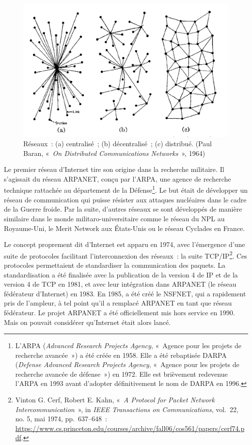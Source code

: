 \documentclass[
  a5paper,
  smalldemyvopaper,10pt,twoside,onecolumn,openright,extrafontsizes,hidelinks]{memoir}
\begin{document}
\begin{figure}

{\centering \includegraphics{chapters/img/baran1964-networks.png}

}

\caption{Réseaux~: (a) centralisé~; (b) décentralisé~; (c) distribué.
(Paul Baran, «~\emph{On Distributed Communications Networks}~», 1964)}

\end{figure}%

Le premier réseau d'Internet tire son origine dans la recherche
militaire. Il s'agissait du réseau ARPANET, conçu par l'ARPA, une agence
de recherche technique rattachée au département de la
Défense\footnote{L'ARPA (\emph{Advanced Research Projects Agency},
  «~Agence pour les projets de recherche avancée~») a été créée en 1958.
  Elle a été rebaptisée DARPA (\emph{Defense Advanced Research Projects
  Agency}, «~Agence pour les projets de recherche avancée de défense~»)
  en 1972. Elle est brièvement redevenue l'ARPA en 1993 avant d'adopter
  définitivement le nom de DARPA en 1996.}. Le but était de développer
un réseau de communication qui puisse résister aux attaques nucléaires
dans le cadre de la Guerre froide. Par la suite, d'autres réseaux se
sont développés de manière similaire dans le monde
militaro-universitaire comme le réseau du NPL au Royaume-Uni, le Merit
Network aux États-Unis ou le réseau Cyclades en France.

Le concept proprement dit d'Internet est apparu en 1974, avec
l'émergence d'une suite de protocoles facilitant l'interconnexion des
réseaux~: la suite TCP/IP\footnote{Vinton G. Cerf, Robert E. Kahn,
  «~\emph{A Protocol for Packet Network Intercommunication}~», in
  \emph{IEEE Transactions on Communications}, vol.~22, no. 5, mai 1974,
  pp.~637--648~:
  \url{https://www.cs.princeton.edu/courses/archive/fall06/cos561/papers/cerf74.pdf}.}.
Ces protocoles permettaient de standardiser la communication des
paquets. La standardisation a été finalisée avec la publication de la
version 4 de IP et de la version 4 de TCP en 1981, et avec leur
intégration dans ARPANET (le réseau fédérateur d'Internet) en 1983. En
1985, a été créé le NSFNET, qui a rapidement pris de l'ampleur, à tel
point qu'il a remplacé ARPANET en tant que réseau fédérateur. Le projet
ARPANET a été officiellement mis hors service en 1990. Mais on pouvait
considérer qu'Internet était alors lancé.
\end{document}

